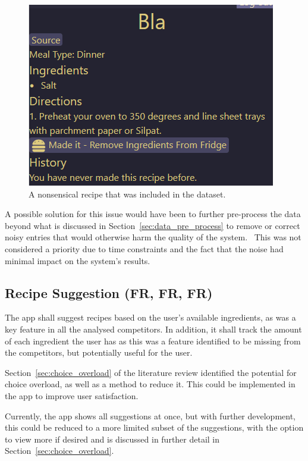 \begin{figure}[p]
    \centering
    \caption{\label{fig:bad_recipe_entry}A nonsensical recipe that was included in the dataset.}
    \includegraphics[scale=0.75]{figures/bad_recipe_entry.png}
\end{figure}

A possible solution for this issue would have been to further pre-process the data beyond what is
discussed in Section~\ref{sec:data_pre_process} to remove or correct noisy entries that would otherwise
harm the quality of the system.~\cite{garcia_big_2016} This was not considered a priority due to time
constraints and the fact that the noise had minimal impact on the system's results.

\subsection{Recipe Suggestion (FR, FR, FR)}
The app shall suggest recipes based on the user's available ingredients, as was a key feature in
all the analysed competitors. In addition, it shall track the amount of each ingredient the user has
as this was a feature identified to be missing from the competitors, but potentially useful for the user.

Section~\ref{sec:choice_overload} of the literature review identified the potential for choice overload,
as well as a method to reduce it. This could be implemented in the \chef{} app to improve user satisfaction.

Currently, the app shows all suggestions at once, but with further development, this could be
reduced to a more limited subset of the suggestions, with the option to view more if desired and is
discussed in further detail in Section~\ref{sec:choice_overload}.

